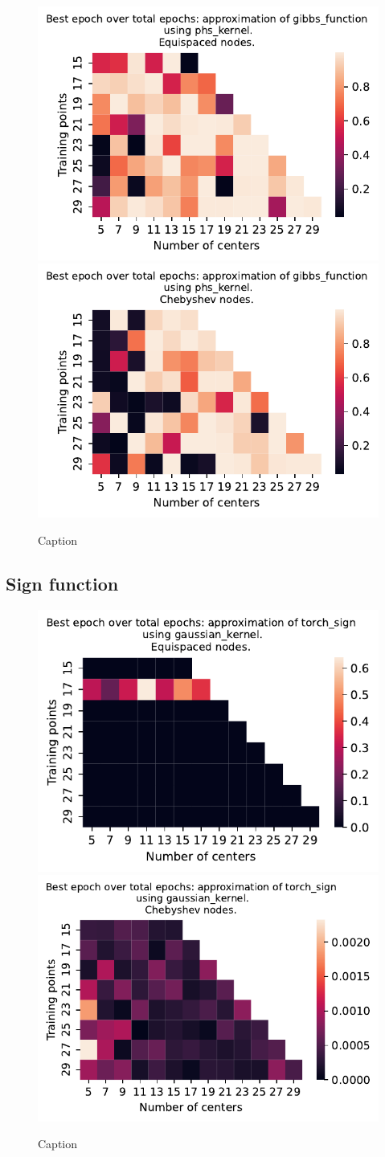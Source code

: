 \documentclass[12pt]{report} %
\begin{document}
\begin{figure}[ht]
    \centering
    
    \includegraphics[width=.49\textwidth]{imagenes/experiments/1d/variational_epochs/gibbs_function-Kphs_kernel-Equi-epochs.pdf}
    \includegraphics[width=.49\textwidth]{imagenes/experiments/1d/variational_epochs/gibbs_function-Kphs_kernel-Cheb-epochs.pdf}
    \caption{Caption}
    \label{fig:epochs-gibbs-phs}
\end{figure}


\subsection*{Sign function}

\begin{figure}[ht]
    \centering
    
    \includegraphics[width=.49\textwidth]{imagenes/experiments/1d/variational_epochs/torch_sign-Kgaussian_kernel-Equi-epochs.pdf}
    \includegraphics[width=.49\textwidth]{imagenes/experiments/1d/variational_epochs/torch_sign-Kgaussian_kernel-Cheb-epochs.pdf}
    \caption{Caption}
    \label{fig:epochs-torch-sign-gaussian}
\end{figure}
\end{document}
